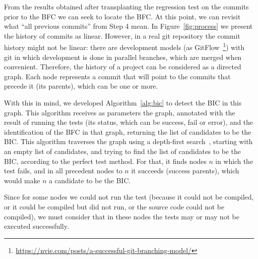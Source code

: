 From the results obtained after transplanting the regression test on the commits prior to the BFC we can seek to locate the BFC.
At this point, we can revisit what ``all previous commits'' from Step 4 mean. 
In Figure~\ref{fig:process} we present the history of commits as linear. 
However, in a real git repository the commit history might not be linear: there are development models (as GitFlow~\footnote{\url{https://nvie.com/posts/a-successful-git-branching-model/}}) with git in which development is done in parallel branches, which are merged when convenient. 
Therefore, the history of a project can be considered as a directed graph. 
Each node represents a commit that will point to the commits that precede it (its parents), which can be one or more.

With this in mind, we developed Algorithm~\ref{alg:bic} to detect the BIC in this graph. 
This algorithm receives as parameters the graph, annotated with the result of running the tests (its status, which can be success, fail or error), and the identification of the BFC in that graph, returning the list of candidates to be the BIC. 
This algorithm traverses the graph using a depth-first search~\cite{cormen2022depthfirstsearch}, starting with an empty list of candidates, and trying to find the list of candidates to be the BIC, according to the perfect test method. 
For that, it finds nodes $n$ in which the test fails, and in all precedent nodes to $n$ it succeeds (success parents), which would make $n$ a candidate to be the BIC.

Since for some nodes we could not run the test (because it could not be compiled, or it could be compiled but did not run, or the source code could not be compiled), we must consider that in these nodes the tests may or may not be executed successfully.


